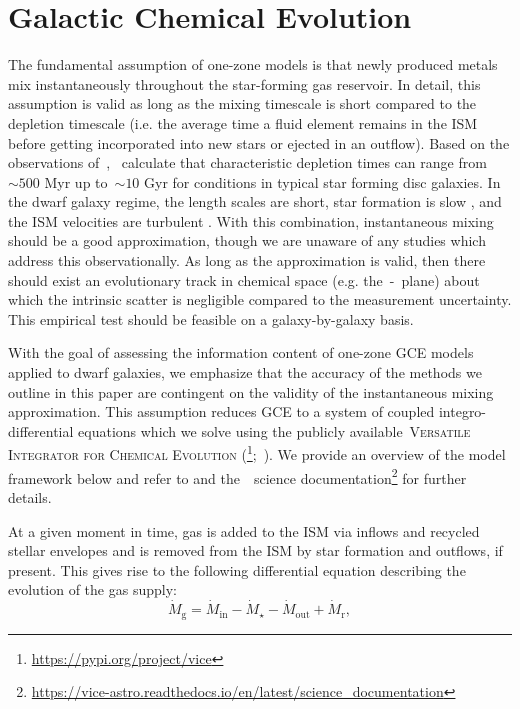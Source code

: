 \documentclass[ms.tex]{subfiles}
\begin{document}
\section{Galactic Chemical Evolution}
\label{sec:onezone}

The fundamental assumption of one-zone models is that newly produced metals mix
instantaneously throughout the star-forming gas reservoir.
In detail, this assumption is valid as long as the mixing timescale is short
compared to the depletion timescale (i.e. the average time a fluid element
remains in the ISM before getting incorporated into new stars or ejected in an
outflow).
Based on the observations of~\citet{Leroy2008},~\citet{Weinberg2017} calculate
that characteristic depletion times can range from~$\sim500$ Myr up to~$\sim10$
Gyr for conditions in typical star forming disc galaxies.
In the dwarf galaxy regime, the length scales are short, star formation is slow
\citep[e.g.][]{Hudson2015}, and the ISM velocities are turbulent
\citep{Dutta2009, Stilp2013, Schleicher2016}.
With this combination, instantaneous mixing should be a good approximation,
though we are unaware of any studies which address this observationally.
As long as the approximation is valid, then there should exist an evolutionary
track in chemical space (e.g. the~\afe-\feh~plane) about which the intrinsic
scatter is negligible compared to the measurement uncertainty.
This empirical test should be feasible on a galaxy-by-galaxy basis.
\par
With the goal of assessing the information content of one-zone GCE models
applied to dwarf galaxies, we emphasize that the accuracy of the methods we
outline in this paper are contingent on the validity of the instantaneous
mixing approximation.
This assumption reduces GCE to a system of coupled integro-differential
equations which we solve using the publicly available~\textsc{Versatile
Integrator for Chemical Evolution} (\vice\footnote{
	\url{https://pypi.org/project/vice}
};~\citealp{Johnson2020}).
We provide an overview of the model framework below and refer to
\citet{Johnson2020} and the~\vice~science documentation\footnote{
	\url{https://vice-astro.readthedocs.io/en/latest/science_documentation}
} for further details.
\par
At a given moment in time, gas is added to the ISM via inflows and recycled
stellar envelopes and is removed from the ISM by star formation and outflows,
if present.
This gives rise to the following differential equation describing the evolution
of the gas supply:
\begin{equation}
\dot{M}_\text{g} = \dot{M}_\text{in} - \dot{M}_\star - \dot{M}_\text{out}
+ \dot{M}_\text{r},
\label{eq:mdotgas}
\end{equation}
\end{document}
